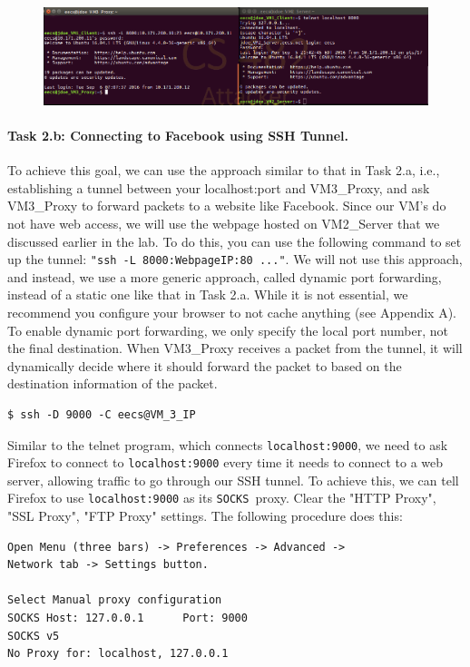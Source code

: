 \begin{figure}[htb]
        \centering
        \includegraphics*[width=1\textwidth]{Figs/tunneltoproxy.png}
\end{figure}





\paragraph{Task 2.b: Connecting to Facebook using SSH Tunnel.}
To achieve this goal, we can use the approach similar to that in 
Task 2.a, i.e., establishing a tunnel between your localhost:port
and VM3\_Proxy, and ask VM3\_Proxy to forward packets to a website like Facebook. Since our VM's do not have web access, we will use the webpage hosted on VM2\_Server that we discussed earlier in the lab.  To do 
this, you can use the following command to set up the tunnel:
{\tt "ssh -L 8000:WebpageIP:80 ..."}. 
We will not use this approach, and instead, we 
use a more generic approach, called dynamic port forwarding, instead of a static one
like that in Task 2.a. While it is not essential, we recommend you configure your browser to not cache anything (see Appendix A). To enable dynamic port forwarding, we only specify the local
port number, not the final destination. When VM3\_Proxy receives
a packet from the tunnel, it will dynamically decide where it should 
forward the packet to based on the destination information of
the packet.
\begin{Verbatim}[frame=single] 
$ ssh -D 9000 -C eecs@VM_3_IP
\end{Verbatim}


Similar to the telnet program, which connects {\tt localhost:9000}, 
we need to ask Firefox to connect to {\tt localhost:9000} every time it 
needs to connect to a web server, allowing traffic to
go through our SSH tunnel. To achieve this, we can tell Firefox to
use {\tt localhost:9000} as its {\tt SOCKS }proxy. Clear the "HTTP Proxy", "SSL Proxy", "FTP Proxy" settings. The following procedure
does this:
\begin{Verbatim}[frame=single] 
Open Menu (three bars) -> Preferences -> Advanced -> 
Network tab -> Settings button.

Select Manual proxy configuration
SOCKS Host: 127.0.0.1      Port: 9000
SOCKS v5
No Proxy for: localhost, 127.0.0.1
\end{Verbatim}

